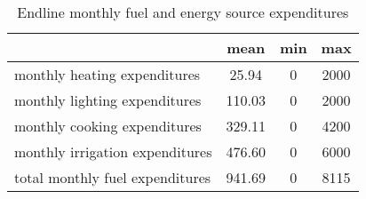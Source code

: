 \begin{table}[htbp]\centering
\def\sym#1{\ifmmode^{#1}\else\(^{#1}\)\fi}
\caption{Endline monthly fuel and energy source expenditures \label{tab:"label"}}
\begin{tabular*}{0.9\hsize}{@{\hskip\tabcolsep\extracolsep\fill}l*{1}{ccc}}
\toprule
                                &     mean&      min&      max\\
\midrule
monthly heating expenditures    &    25.94&        0&     2000\\
monthly lighting expenditures   &   110.03&        0&     2000\\
monthly cooking expenditures    &   329.11&        0&     4200\\
monthly irrigation expenditures &   476.60&        0&     6000\\
total monthly fuel expenditures &   941.69&        0&     8115\\
\bottomrule
\end{tabular*}
\end{table}
